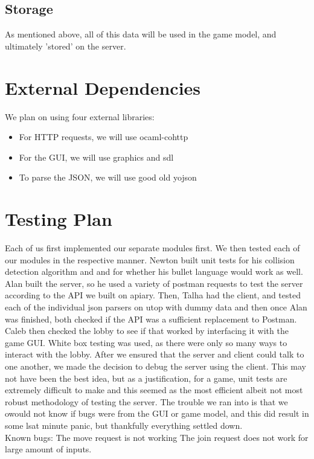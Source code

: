 \documentclass{article}
\begin{document}
    \subsection{Storage}
    As mentioned above, all of this data will be used in the game model, and ultimately 'stored' on the server.

    \section{External Dependencies}
    We plan on using four external libraries:
    \begin{itemize}
   	 \item For HTTP requests, we will use ocaml-cohttp
    	\item For the GUI, we will use graphics and sdl
	\item To parse the JSON, we will use good old yojson
    \end{itemize}

    \section{Testing Plan}
    Each of us first implemented our separate modules first. We then tested each of our modules in the respective manner. Newton built unit tests for his collision detection algorithm and and for whether his bullet language would work as well. Alan built the server, so he used a variety of postman requests to test the server according to the API we built on apiary. Then, Talha had the client, and tested each of the individual json parsers on utop with dummy data and then once Alan was finished, both checked if the API was a sufficient replacement to Postman. Caleb then checked the lobby to see if that worked by interfacing it with the game GUI. White box testing was used, as there were only so many ways to interact with the lobby. After we ensured that the server and client could talk to one another, we made the decision to debug the server using the client. This may not have been the best idea, but as a justification, for a game, unit tests are extremely difficult to make and this seemed as the most efficient albeit not most robust methodology of testing the server. The trouble we ran into is that we owould not know if bugs were from the GUI or game model, and this did result in some lsat minute panic, but thankfully everything settled down.\\
    
    Known bugs: 
     The move request is not working
     The join request does not work for large amount of inputs.
\end{document}

